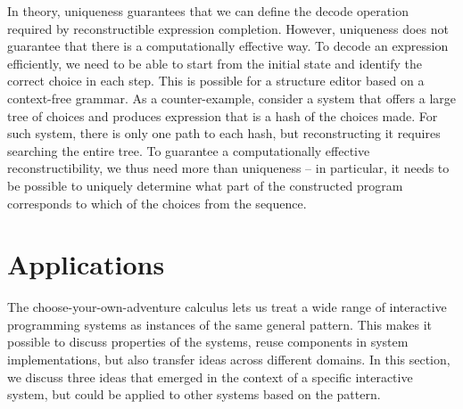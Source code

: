 \documentclass[anonymous, a4paper,UKenglish,cleveref, autoref, thm-restate]{lipics-v2021}
\newcommand{\ident}[1]{\textsf{#1}}
\begin{document}
In theory, uniqueness guarantees that we can define the \ident{decode} operation required
by reconstructible expression completion. However, uniqueness does not guarantee that there is
a computationally effective way. To decode an expression efficiently, we need to be able to
start from the initial state and identify the correct choice in each step. This is possible for
a structure editor based on a context-free grammar. As a counter-example, consider a system that
offers a large tree of choices and produces expression that is a hash of the choices made. For
such system, there is only one path to each hash, but reconstructing it requires searching the
entire tree. To guarantee a computationally effective reconstructibility, we thus need more than
uniqueness -- in particular, it needs to be possible to uniquely determine what part of the
constructed program corresponds to which of the choices from the sequence.

\section{Applications}
\label{sec:applications}

The choose-your-own-adventure calculus lets us treat a wide range of interactive programming
systems as instances of the same general pattern. This makes it possible to discuss properties
of the systems, reuse components in system implementations,
but also transfer ideas across different domains. In this section, we discuss three ideas that
emerged in the context of a specific interactive system, but could be applied to other systems
based on the pattern.
\end{document}

